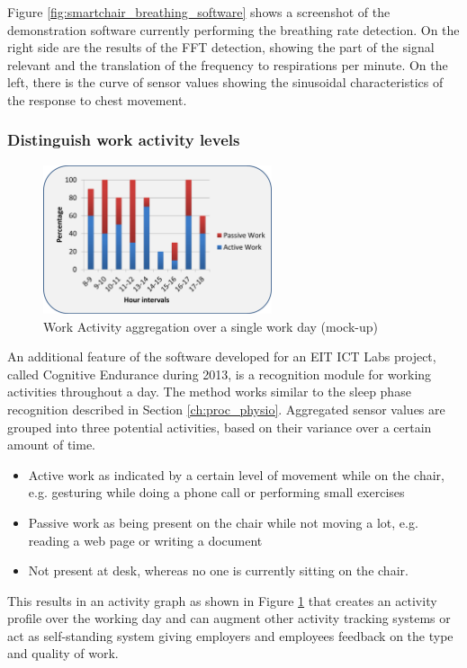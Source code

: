 Figure \ref{fig:smartchair_breathing_software} shows a screenshot of the demonstration software currently performing the breathing rate detection. On the right side are the results of the FFT detection, showing the part of the signal relevant and the translation of the frequency to respirations per minute. On the left, there is the curve of sensor values showing the sinusoidal characteristics of the response to chest movement.

\subsubsection*{Distinguish work activity levels}
\begin{figure}[ht]
\centering
\includegraphics[width=0.6\textwidth]{images/smartchair_workact}
\caption{ Work Activity aggregation over a single work day (mock-up)}
\label{fig:smartchair_workact}
\end{figure}
An additional feature of the software developed for an EIT ICT Labs project, called Cognitive Endurance during 2013, is a recognition module for working activities throughout a day. The method works similar to the sleep phase recognition described in Section \ref{ch:proc_physio}. Aggregated sensor values are grouped into three potential activities, based on their variance over a certain amount of time.
\begin{itemize}
\item Active work as indicated by a certain level of movement while on the chair, e.g. gesturing while doing a phone call or performing small exercises
\item Passive work as being present on the chair while not moving a lot, e.g. reading a web page or writing a document
\item Not present at desk, whereas no one is currently sitting on the chair.
\end{itemize}

This results in an activity graph as shown in Figure \ref{fig:smartchair_workact} that creates an activity profile over the working day and can augment other activity tracking systems or act as self-standing system giving employers and employees feedback on the type and quality of work.

